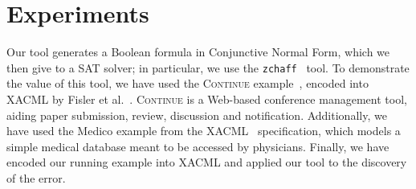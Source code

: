 \section{Experiments}
\label{sec:experiments}

Our tool generates a Boolean formula in Conjunctive Normal Form, which
we then give to a SAT solver; in particular, we use the
\texttt{zchaff}~\cite{moskewicz01chaff} tool.  To demonstrate the
value of this tool, we have used the \textsc{Continue}
example~\cite{XXX}, encoded into XACML by Fisler et
al.~\cite{fisler05}.  \textsc{Continue} is a Web-based conference
management tool, aiding paper submission, review, discussion and
notification.  Additionally, we have used the Medico example from the
XACML~\cite{xacml} specification, which models a simple medical
database meant to be accessed by physicians.  Finally, we have encoded
our running example into XACML and applied our tool to the discovery
of the error.

